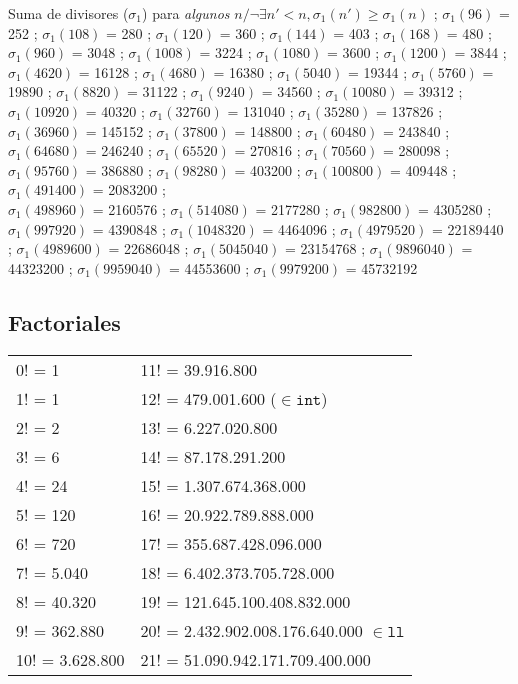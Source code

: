 \documentclass{article}
\begin{document}
\begin{multicols*}{2}
%
Suma de divisores ($\sigma_1$) para \emph{algunos} $n / \neg\exists n'<n, \sigma_1(n') \geqslant \sigma_1(n)$ ;
$\sigma_1(96)$ = 252 ; $\sigma_1(108)$ = 280 ; $\sigma_1(120)$ = 360 ; $\sigma_1(144)$ = 403 ; $\sigma_1(168)$ = 480 ;
$\sigma_1(960)$ = 3048 ; $\sigma_1(1008)$ = 3224 ; $\sigma_1(1080)$ = 3600 ; $\sigma_1(1200)$ = 3844 ;
$\sigma_1(4620)$ = 16128 ; $\sigma_1(4680)$ = 16380 ; $\sigma_1(5040)$ = 19344 ; $\sigma_1(5760)$ = 19890 ;
$\sigma_1(8820)$ = 31122 ; $\sigma_1(9240)$ = 34560 ; $\sigma_1(10080)$ = 39312 ; $\sigma_1(10920)$ = 40320 ;
$\sigma_1(32760)$ = 131040 ; $\sigma_1(35280)$ = 137826 ; $\sigma_1(36960)$ = 145152 ; $\sigma_1(37800)$ = 148800 ;
$\sigma_1(60480)$ = 243840 ; $\sigma_1(64680)$ = 246240 ; $\sigma_1(65520)$ = 270816 ; $\sigma_1(70560)$ = 280098 ;
$\sigma_1(95760)$ = 386880 ; $\sigma_1(98280)$ = 403200 ; $\sigma_1(100800)$ = 409448  ;
$\sigma_1(491400)$ = 2083200 ; \\$\sigma_1(498960)$ = 2160576 ; $\sigma_1(514080)$ = 2177280 ;
$\sigma_1(982800)$ = 4305280 ; $\sigma_1(997920)$ = 4390848 ; $\sigma_1(1048320)$ = 4464096 ;
$\sigma_1(4979520)$ = 22189440 ; $\sigma_1(4989600)$ = 22686048 ; $\sigma_1(5045040)$ = 23154768 ;
$\sigma_1(9896040)$ = 44323200 ; $\sigma_1(9959040)$ = 44553600 ; $\sigma_1(9979200)$ = 45732192
%
%
\subsection{Factoriales}
\begin{tabular}{l|l}
0! =	1             & 11! = 39.916.800  \\
1! =	1             & 12! =	479.001.600	($\in \mathtt{int}$)\\
2! =	2             & 13! =	6.227.020.800	\\
3! =	6             & 14! =	87.178.291.200	\\
4! =	24            & 15! =	1.307.674.368.000	\\
5! =	120   			  & 16! =	20.922.789.888.000	\\
6! =	720           & 17! =	355.687.428.096.000	\\
7! =	5.040	        & 18! =	6.402.373.705.728.000	\\
8! =	40.320	      & 19! =	121.645.100.408.832.000	\\
9! =	362.880       & 20! =	2.432.902.008.176.640.000 $\in \mathtt{ll}$ \\
10! =	3.628.800     & 21! =	51.090.942.171.709.400.000
\end{tabular}


\end{multicols*}
\end{document}

